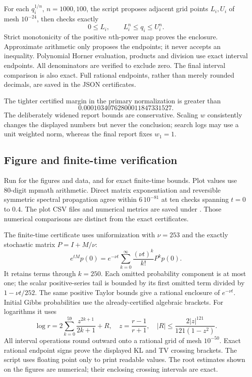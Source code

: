 \documentclass[11pt]{article}
\begin{document}
For each $q_i^{1/n}$, $n=1000,100$, the script proposes adjacent grid points $L_i,U_i$ of mesh $10^{-24}$, then checks exactly
\[
0\leq L_i,\qquad L_i^n\leq q_i\leq U_i^n.
\]
Strict monotonicity of the positive $n$th-power map proves the enclosure. Approximate arithmetic only proposes the endpoints; it never accepts an inequality. Polynomial Horner evaluation, products and division use exact interval endpoints. All denominators are verified to exclude zero. The final interval comparison is also exact. Full rational endpoints, rather than merely rounded decimals, are saved in the JSON certificates.

The tighter certified margin in the primary normalization is greater than
\[0.00010340762800011847331527.\]
The deliberately widened report bounds are conservative. Scaling $w$ consistently changes the displayed numbers but never the conclusion; search logs may use a unit weighted norm, whereas the final report fixes $w_1=1$.

\subsection{Figure and finite-time verification}
Run  for the figures and data, and  for exact finite-time bounds. Plot values use 80-digit mpmath arithmetic. Direct matrix exponentiation and reversible symmetric spectral propagation agree within $6\,10^{-81}$ at ten checks spanning $t=0$ to $0.4$. The plot CSV files and numerical metrics are saved under . Those numerical comparisons are distinct from the exact certificates.

The finite-time certificate uses uniformization with $\nu=253$ and the exactly stochastic matrix $P=I+M/\nu$:
\[
e^{tM}p(0)=e^{-\nu t}\sum_{k=0}^{\infty}\frac{(\nu t)^k}{k!}P^kp(0).
\]
It retains terms through $k=250$. Each omitted probability component is at most one; the scalar positive-series tail is bounded by its first omitted term divided by $1-\nu t/252$. The same positive Taylor bounds give a rational enclosure of $e^{-\nu t}$. Initial Gibbs probabilities use the already-certified algebraic brackets. For logarithms it uses
\[
\log r=2\sum_{k=0}^{59}\frac{z^{2k+1}}{2k+1}+R,
\quad z=\frac{r-1}{r+1},\quad
|R|\leq\frac{2|z|^{121}}{121(1-z^2)}.
\]
All interval operations round outward onto a rational grid of mesh $10^{-50}$. Exact rational endpoint signs prove the displayed KL and TV crossing brackets. The script uses floating point only to print readable values. The root estimates shown on the figures are numerical; their enclosing crossing intervals are exact.
\end{document}
